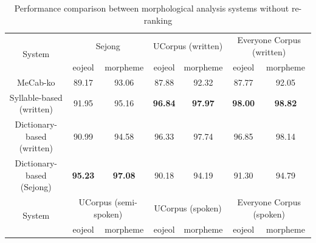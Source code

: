 \documentclass[AMS,STIX2COL]{WileyNJD-v2}
\begin{document}
    \begin{table}[]
        \caption{Performance comparison between morphological analysis systems without re-ranking}\label{tab:performance-without-reranking}
        \begin{tabular*}{500pt}{@{\extracolsep\fill}c|cccccc@{\extracolsep\fill}}
            \toprule
            \multirow{2}{*}{System} & \multicolumn{2}{c}{Sejong} & \multicolumn{2}{c}{UCorpus (written)} & \multicolumn{2}{c}{Everyone Corpus (written)} \\
            \cmidrule{2-3} \cmidrule{4-5} \cmidrule{6-7}
            & \multicolumn{1}{c}{eojeol} & \multicolumn{1}{c}{morpheme} & \multicolumn{1}{c}{eojeol} & \multicolumn{1}{c}{morpheme} & \multicolumn{1}{c}{eojeol} & \multicolumn{1}{c}{morpheme} \\
            \midrule
            \hspace{2mm}MeCab-ko                   & 89.17                      & 93.06                        & 87.88                      & 92.32                        & 87.77                      & 92.05                        \\
            \hspace{2mm}Syllable-based (written)   & 91.95                      & 95.16                        & \textbf{96.84}             & \textbf{97.97}               & \textbf{98.00}             & \textbf{98.82}               \\
            \hspace{2mm}Dictionary-based (written) & 90.99                      & 94.58                        & 96.33                      & 97.74                        & 96.85                      & 98.14                        \\
            \hspace{2mm}Dictionary-based (Sejong)  & \textbf{95.23}             & \textbf{97.08}               & 90.18                      & 94.19                        & 91.30                      & 94.79                        \\
            \toprule
            \multirow{2}{*}{System} & \multicolumn{2}{c}{UCorpus (semi-spoken)} & \multicolumn{2}{c}{UCorpus (spoken)} & \multicolumn{2}{c}{Everyone Corpus (spoken)} \\
            \cmidrule{2-3} \cmidrule{4-5} \cmidrule{6-7}
            & \multicolumn{1}{c}{eojeol} & \multicolumn{1}{c}{morpheme} & \multicolumn{1}{c}{eojeol} & \multicolumn{1}{c}{morpheme} & \multicolumn{1}{c}{eojeol} & \multicolumn{1}{c}{morpheme} \\

\end{tabular*}
\end{table}
\end{document}

